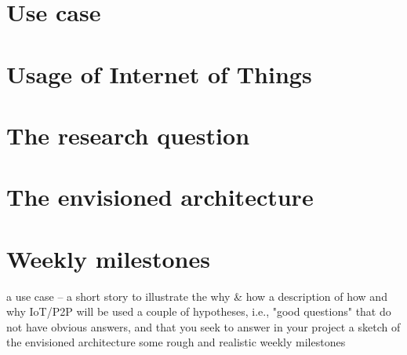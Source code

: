 \documentclass[conference]{IEEEtran}
\begin{document}
\section{Use case}

\section{Usage of Internet of Things}

\section{The research question}

\section{The envisioned architecture}

\section{Weekly milestones}


a use case – a short story to illustrate the why & how
a description of how and why IoT/P2P will be used
a couple of hypotheses, i.e., "good questions" that do not have obvious answers, and that you seek to answer in your project
a sketch of the envisioned architecture
some rough and realistic weekly milestones





\end{document}
